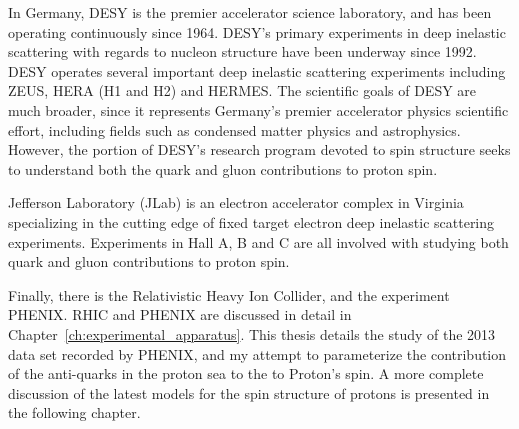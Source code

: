 In Germany, DESY is the premier accelerator science laboratory, and has been
operating continuously since 1964. DESY's primary experiments in deep inelastic
scattering with regards to nucleon structure have been underway since 1992. DESY
operates several important deep inelastic scattering experiments including ZEUS,
HERA (H1 and H2) and HERMES. The scientific goals of DESY are much broader,
since it represents Germany's premier accelerator physics scientific effort,
including fields such as condensed matter physics and astrophysics. However, the
portion of DESY's research program devoted to spin structure seeks to understand
both the quark and gluon contributions to proton spin.

Jefferson Laboratory (JLab) is an electron accelerator complex in Virginia
specializing in the cutting edge of fixed target electron deep inelastic
scattering experiments. Experiments in Hall A, B and C are all involved with
studying both quark and gluon contributions to proton spin.

Finally, there is the Relativistic Heavy Ion Collider, and the experiment
PHENIX. RHIC and PHENIX are discussed in detail in
Chapter~\ref{ch:experimental_apparatus}. This thesis details the study of the
2013 data set recorded by PHENIX, and my attempt to parameterize the
contribution of the anti-quarks in the proton sea to the to Proton's spin. A
more complete discussion of the latest models for the spin structure of protons
is presented in the following chapter.
